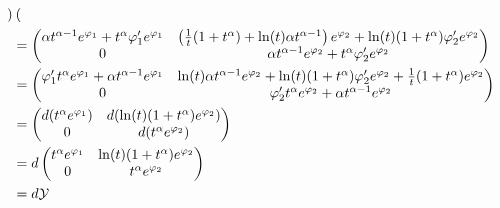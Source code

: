 \begin{rem}
\begin{align*}
\begin{pmatrix}
    \end{pmatrix}
    \\&=\begin{pmatrix}
      \alpha t^{\alpha-1}e^{\varphi_1} + t^\alpha\varphi_1'e^{\varphi_1} 
      & \left(\frac{1}{t}(1+t^\alpha)+\ln(t)\alpha t^{\alpha-1}\right)e^{\varphi_2}
      + \ln(t)(1+t^\alpha)\varphi_2'e^{\varphi_2}
      \\ 0 & \alpha t^{\alpha-1}e^{\varphi_2} + t^\alpha\varphi_2'e^{\varphi_2}
    \end{pmatrix}
    \\&=\begin{pmatrix}
      \varphi_1' t^\alpha e^{\varphi_1} +\alpha t^{\alpha-1} e^{\varphi_1} 
      &
      \ln(t)\alpha t^{\alpha-1}e^{\varphi_2}
      +\ln(t)(1+t^\alpha)\varphi_2'e^{\varphi_2}
      +\frac{1}{t}(1+t^\alpha)e^{\varphi_2}
      \\0 & \varphi_2' t^\alpha e^{\varphi_2}+\alpha t^{\alpha-1} e^{\varphi_2}
    \end{pmatrix}
    \\&=\begin{pmatrix}
      d(t^\alpha e^{\varphi_1}) & d(\ln(t)(1+t^\alpha)e^{\varphi_2})
      \\0 & d(t^\alpha e^{\varphi_2})
    \end{pmatrix}
    \\&=d\begin{pmatrix}
      t^\alpha e^{\varphi_1} & \ln(t)(1+t^\alpha)e^{\varphi_2}
      \\0 & t^\alpha e^{\varphi_2}
    \end{pmatrix}
    \\&=d\mathcal{Y}
  \end{align*}
\end{rem}

